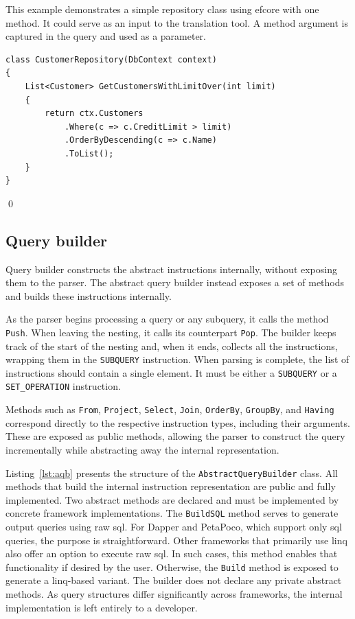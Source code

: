 \begin{example}
\small
This example demonstrates a simple repository class using \acrshort{efcore} with one method. 
It could serve as an input to the translation tool. A method argument is captured in the query and used as a parameter. 
\begin{lstlisting}[language=CSharp]
class CustomerRepository(DbContext context)
{
    List<Customer> GetCustomersWithLimitOver(int limit)
    {
        return ctx.Customers
            .Where(c => c.CreditLimit > limit)
            .OrderByDescending(c => c.Name)
            .ToList();
    }
}
\end{lstlisting}
\qed
\end{example}

\subsection{Query builder}

Query builder constructs the abstract instructions internally, without exposing them to the parser. The abstract query builder instead exposes a set of methods and builds these instructions internally.

As the parser begins processing a query or any subquery, it calls the method \texttt{Push}. When leaving the nesting, it calls its counterpart \texttt{Pop}. The builder keeps track of the start of the nesting and, when it ends, collects all the instructions, wrapping them in the \texttt{SUBQUERY} instruction. When parsing is complete, the list of instructions should contain a single element. It must be either a \texttt{SUBQUERY} or a \texttt{SET\_OPERATION} instruction.

Methods such as \texttt{From}, \texttt{Project}, \texttt{Select}, \texttt{Join}, \texttt{OrderBy}, \texttt{GroupBy}, and \texttt{Having} correspond directly to the respective instruction types, including their arguments. These are exposed as public methods, allowing the parser to construct the query incrementally while abstracting away the internal representation.

Listing~\ref{lst:aqb} presents the structure of the \texttt{AbstractQueryBuilder} class. All methods that build the internal instruction representation are public and fully implemented. Two abstract methods are declared and must be implemented by concrete framework implementations. The \texttt{BuildSQL} method serves to generate output queries using raw \acrshort{sql}. For Dapper and PetaPoco, which support only \acrshort{sql} queries, the purpose is straightforward. Other frameworks that primarily use \acrshort{linq} also offer an option to execute raw \acrshort{sql}. In such cases, this method enables that functionality if desired by the user. Otherwise, the \texttt{Build} method is exposed to generate a \acrshort{linq}-based variant. The builder does not declare any private abstract methods. As query structures differ significantly across frameworks, the internal implementation is left entirely to a developer.

